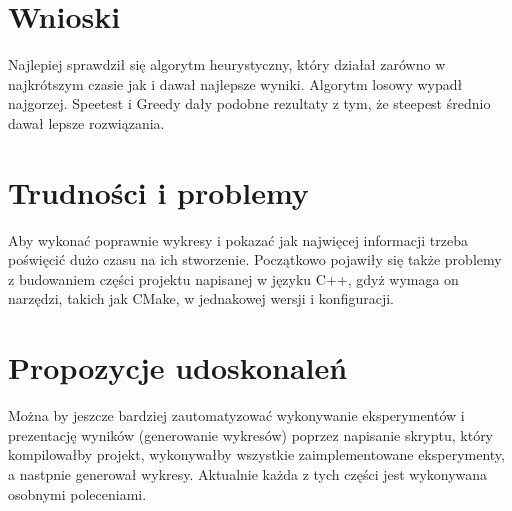 \documentclass{article}
\begin{document}
\section{Wnioski}

Najlepiej sprawdził się algorytm heurystyczny, który działał zarówno w najkrótszym czasie jak i dawał najlepsze wyniki. Algorytm losowy wypadł najgorzej. Speetest i Greedy dały podobne rezultaty z tym, że steepest średnio dawał lepsze rozwiązania.

\section{Trudności i problemy}

Aby wykonać poprawnie wykresy i pokazać jak najwięcej informacji trzeba poświęcić dużo czasu na ich stworzenie. Początkowo pojawiły się także problemy z budowaniem części projektu napisanej w języku C++, gdyż wymaga on narzędzi, takich jak CMake, w jednakowej wersji i konfiguracji.

\section{Propozycje udoskonaleń}

Można by jeszcze bardziej zautomatyzować wykonywanie eksperymentów i prezentację wyników (generowanie wykresów) poprzez napisanie skryptu, który kompilowałby projekt, wykonywałby wszystkie zaimplementowane eksperymenty, a nastpnie generował wykresy. Aktualnie każda z tych części jest wykonywana osobnymi poleceniami.

\clearpage

\printbibliography
\end{document}
